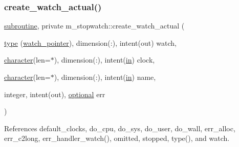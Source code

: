 \subsubsection{\texorpdfstring{create\+\_\+watch\+\_\+actual()}{create\_watch\_actual()}}
{\footnotesize\ttfamily \hyperlink{M__stopwatch_83_8txt_acfbcff50169d691ff02d4a123ed70482}{subroutine}, private m\+\_\+stopwatch\+::create\+\_\+watch\+\_\+actual (\begin{DoxyParamCaption}\item[{\hyperlink{stop__watch_83_8txt_a70f0ead91c32e25323c03265aa302c1c}{type} (\hyperlink{structm__stopwatch_1_1watch__pointer}{watch\+\_\+pointer}), dimension(\+:), intent(out)}]{watch,  }\item[{\hyperlink{option__stopwatch_83_8txt_abd4b21fbbd175834027b5224bfe97e66}{character}(len=$\ast$), dimension(\+:), intent(\hyperlink{M__journal_83_8txt_afce72651d1eed785a2132bee863b2f38}{in})}]{clock,  }\item[{\hyperlink{option__stopwatch_83_8txt_abd4b21fbbd175834027b5224bfe97e66}{character}(len=$\ast$), dimension(\+:), intent(\hyperlink{M__journal_83_8txt_afce72651d1eed785a2132bee863b2f38}{in})}]{name,  }\item[{integer, intent(out), \hyperlink{option__stopwatch_83_8txt_aa4ece75e7acf58a4843f70fe18c3ade5}{optional}}]{err }\end{DoxyParamCaption})\hspace{0.3cm}{\ttfamily [private]}}



References default\+\_\+clocks, do\+\_\+cpu, do\+\_\+sys, do\+\_\+user, do\+\_\+wall, err\+\_\+alloc, err\+\_\+c2long, err\+\_\+handler\+\_\+watch(), omitted, stopped, type(), and watch.

\mbox{\label{namespacem__stopwatch_a756111aaa293cf98f78d2bf93eb58723}} 
